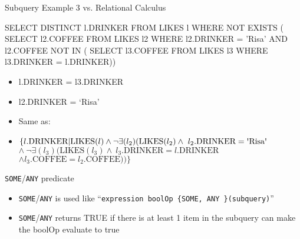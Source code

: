 \documentclass[aspectratio=169]{beamer}
\newenvironment{noindentitemize}
{ \begin{itemize}
 \setlength{\itemsep}{1.5ex}
  \setlength{\parsep}{0pt}   
  \setlength{\parskip}{0pt}
 \addtolength{\leftskip}{-2em}
 }
{ \end{itemize} }
\newcommand{\LIKES}{\textrm{LIKES}}
\newcommand{\COFFEE}{\textrm{COFFEE}}
\newcommand{\DRINKER}{\textrm{DRINKER}}
\begin{document}
\begin{frame}[fragile]{Subquery Example 3 vs. Relational Calculus}

\begin{SQL}
SELECT DISTINCT l.DRINKER
FROM LIKES l
WHERE NOT EXISTS (
  SELECT l2.COFFEE 
  FROM LIKES l2
  WHERE l2.DRINKER = 'Risa' AND l2.COFFEE NOT IN (
    SELECT l3.COFFEE
    FROM LIKES l3
    WHERE l3.DRINKER = l.DRINKER))
\end{SQL}

\begin{noindentitemize}
\item l.DRINKER = l3.DRINKER
\item l2.DRINKER = `Risa'
\item Same as:
	\item[] $\{l.\DRINKER | \LIKES(l) \wedge \neg \exists(l_2)(\LIKES(l_2) \wedge\ 
	   l_2.\DRINKER = \textrm{\textquotesingle{Risa}\textquotesingle}$\\

           \hspace{2em}$\wedge\ \neg \exists(l_3)(\LIKES(l_3) \wedge\
		l_3.\DRINKER = l.\DRINKER $\\
	\hspace{2em}$\wedge l_3.\COFFEE = l_2.\COFFEE))\}$
\end{noindentitemize}
\end{frame}

\begin{frame}{\texttt{SOME}/\texttt{ANY} predicate}


\begin{noindentitemize}
\item \texttt{SOME}/\texttt{ANY} is used like ``\texttt{expression boolOp \{SOME, ANY \}(subquery)}''
\item \texttt{SOME}/\texttt{ANY} returns TRUE if there is at least 1 item in the subquery can make the boolOp evaluate to true
\end{noindentitemize}
\end{frame}

\end{document}

